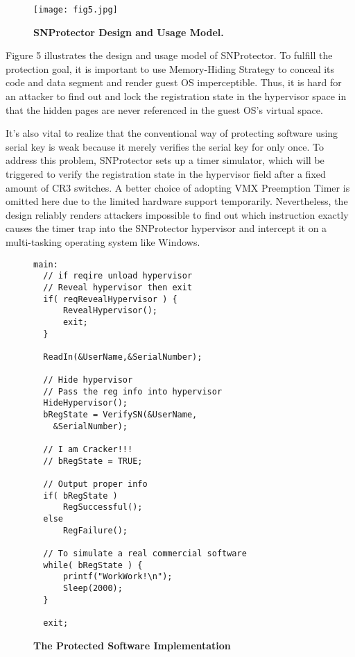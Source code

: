 \documentclass[conference]{IEEEtran}
\begin{document}
{\begin{figure}[!htb]
\begin{center}
\texttt{[image: fig5.jpg]}
\end{center}
\caption{{\bf SNProtector Design and Usage Model.}} \label{Figure
5.}
\end{figure}

Figure 5 illustrates the design and usage model of SNProtector. To
fulfill the protection goal, it is important to use Memory-Hiding
Strategy to conceal its code and data segment and render guest OS
imperceptible. Thus, it is hard for an attacker to find out and lock
the registration state in the hypervisor space in that the hidden
pages are never referenced in the guest OS's virtual space.

It's also vital to realize that the conventional way of protecting
software using serial key is weak because it merely verifies the
serial key for only once. To address this problem, SNProtector sets
up a timer simulator, which will be triggered to verify the
registration state in the hypervisor field after a fixed amount of
CR3 switches. A better choice of adopting VMX Preemption Timer is
omitted here due to the limited hardware support temporarily.
Nevertheless, the design reliably renders attackers impossible to
find out which instruction exactly causes the timer trap into the
SNProtector hypervisor and intercept it on a multi-tasking operating
system like Windows.

\begin{figure}
\begin{lstlisting}
main:
  // if reqire unload hypervisor
  // Reveal hypervisor then exit
  if( reqRevealHypervisor ) {
      RevealHypervisor();
      exit;
  }

  ReadIn(&UserName,&SerialNumber);

  // Hide hypervisor
  // Pass the reg info into hypervisor
  HideHypervisor();
  bRegState = VerifySN(&UserName,
    &SerialNumber);

  // I am Cracker!!!
  // bRegState = TRUE;

  // Output proper info
  if( bRegState )
      RegSuccessful();
  else
      RegFailure();

  // To simulate a real commercial software
  while( bRegState ) {
      printf("WorkWork!\n");
      Sleep(2000);
  }

  exit;
\end{lstlisting}
\caption{{\bf The Protected Software Implementation}}
\label{Figure 10.}
\end{figure}

}
\end{document}
